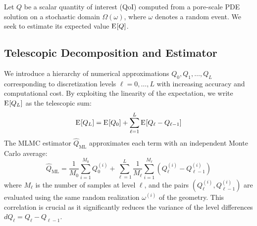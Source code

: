 \documentclass[preprint,12pt]{elsarticle}
\newcommand{\qoi}{Q}
\newcommand{\maxl}{L}
\newcommand{\E}[1]{{\ensuremath{\mathrm{E}}\mspace{-2mu}\left[#1\right]}}
\begin{document}
Let $\qoi$ be a scalar quantity of interest (QoI) computed from a pore-scale PDE solution on a stochastic domain $\Omega(\omega)$, where $\omega$ denotes a random event. We seek to estimate its expected value $\E{\qoi}$. 

\subsection{Telescopic Decomposition and Estimator}
We introduce a hierarchy of numerical approximations $\qoi_0, \qoi_1, \dots, \qoi_\maxl$ corresponding to discretization levels $\ell = 0, \dots, \maxl$ with increasing accuracy and computational cost. By exploiting the linearity of the expectation, we write $\E{\qoi_\maxl}$ as the telescopic sum:
\begin{equation}
\E{\qoi_\maxl} = \E{\qoi_0} + \sum_{\ell=1}^{\maxl} \E{\qoi_\ell - \qoi_{\ell-1}}
\end{equation}
The MLMC estimator $\widehat{\qoi}_{\text{ML}}$ approximates each term with an independent Monte Carlo average:
\begin{equation}
\label{eq:mlmc_estimator}
\widehat{\qoi}_{\text{ML}} = \frac{1}{M_0} \sum_{i=1}^{M_0} \qoi_0^{(i)} + \sum_{\ell=1}^{\maxl} \frac{1}{M_\ell} \sum_{i=1}^{M_\ell} \left( \qoi_\ell^{(i)} - \qoi_{\ell-1}^{(i)} \right)
\end{equation}
where $M_\ell$ is the number of samples at level $\ell$, and the pairs $(\qoi_\ell^{(i)}, \qoi_{\ell-1}^{(i)})$ are evaluated using the same random realization $\omega^{(i)}$ of the geometry. This correlation is crucial as it significantly reduces the variance of the level differences $d\qoi_\ell = \qoi_\ell - \qoi_{\ell-1}$.
\end{document}
